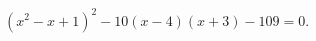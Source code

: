 \begin{ex}[type=equation]
	\begin{condition}
		$\left(x^2 - x + 1\right)^2 - 10\left(x - 4\right)(x + 3) -109 = 0.$
	\end{condition}
\end{ex}
